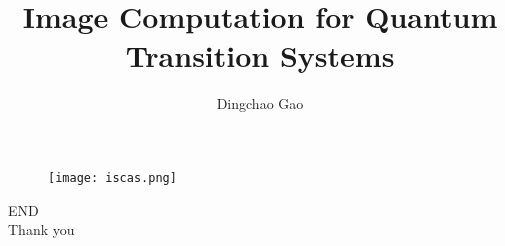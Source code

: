 \documentclass[aspectratio=1610]{beamer}
\title[TDD in quantum]{Image Computation for Quantum Transition Systems}
\author[Gcc]{Dingchao Gao}
\begin{document}
\begin{frame}[plain]
  \titlepage
  \begin{figure}
    \texttt{[image: iscas.png]}
  \end{figure}
\end{frame}

\begin{frame}
\centering
\Huge{END\\Thank you}
\end{frame}
\end{document}
